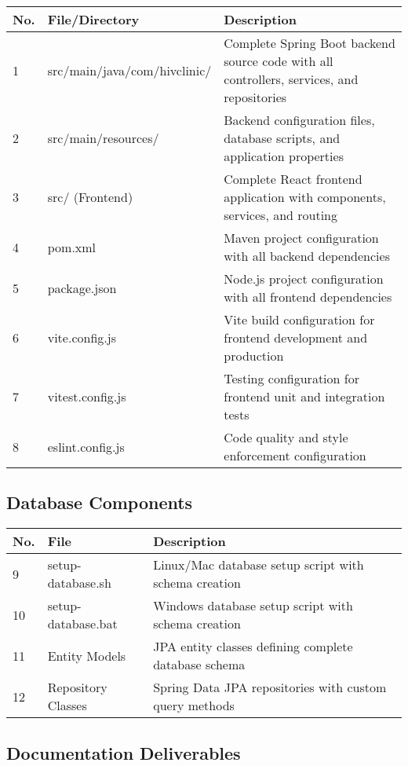 \documentclass[12pt,a4paper]{article}
\begin{document}
\begin{longtable}{|p{1cm}|p{6cm}|p{7cm}|}
\hline
\textbf{No.} & \textbf{File/Directory} & \textbf{Description} \\
\hline
1 & src/main/java/com/hivclinic/ & Complete Spring Boot backend source code with all controllers, services, and repositories \\
\hline
2 & src/main/resources/ & Backend configuration files, database scripts, and application properties \\
\hline
3 & src/ (Frontend) & Complete React frontend application with components, services, and routing \\
\hline
4 & pom.xml & Maven project configuration with all backend dependencies \\
\hline
5 & package.json & Node.js project configuration with all frontend dependencies \\
\hline
6 & vite.config.js & Vite build configuration for frontend development and production \\
\hline
7 & vitest.config.js & Testing configuration for frontend unit and integration tests \\
\hline
8 & eslint.config.js & Code quality and style enforcement configuration \\
\hline
\end{longtable}

\subsection{Database Components}

\begin{longtable}{|p{1cm}|p{6cm}|p{7cm}|}
\hline
\textbf{No.} & \textbf{File} & \textbf{Description} \\
\hline
9 & setup-database.sh & Linux/Mac database setup script with schema creation \\
\hline
10 & setup-database.bat & Windows database setup script with schema creation \\
\hline
11 & Entity Models & JPA entity classes defining complete database schema \\
\hline
12 & Repository Classes & Spring Data JPA repositories with custom query methods \\
\hline
\end{longtable}

\subsection{Documentation Deliverables}
\end{document}
